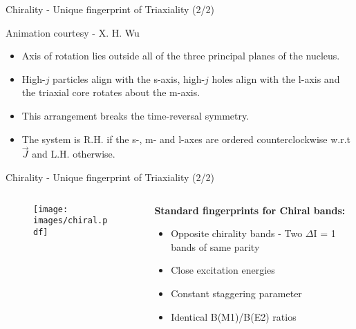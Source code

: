 \documentclass [aspectratio=169]{beamer}
\begin{document}
\begin{frame}{Chirality - Unique fingerprint of Triaxiality (2/2)}
\vspace{-10pt}
\begin{center}
\begin{figure}
\end{figure}
\scriptsize{\color{violet} Animation courtesy - X. H. Wu} 
\end{center}
\begin{itemize}
\item{Axis of rotation lies outside all of the three principal planes of the nucleus.}
\item{High-\textbf{$j$} particles align with the s-axis, high-\textbf{$j$} holes align with the l-axis and the triaxial core rotates about the m-axis.}
\item{This arrangement breaks the time-reversal symmetry.}
\item{The system is R.H. if the s-, m- and l-axes are ordered counterclockwise w.r.t \textbf{$\vec{J}$} and L.H. otherwise.}
\end{itemize}
\end{frame}

\begin{frame}{Chirality - Unique fingerprint of Triaxiality (2/2)}
\begin{columns}[c]
\begin{column}{0.5\textwidth}
\begin{center}
\begin{figure}
\texttt{[image: images/chiral.pdf]}
\end{figure}
\end{center}
\end{column}
\begin{column}{0.5\textwidth}
\textbf{Standard fingerprints for Chiral bands:}
\begin{itemize}
\item{Opposite chirality bands - Two $\Delta$I = 1 bands of same parity}
\item{Close excitation energies}
\item{Constant staggering parameter}
\item{Identical B(M1)/B(E2) ratios}
\end{itemize}
\end{column}
\end{columns}
\end{frame}
\end{document}

